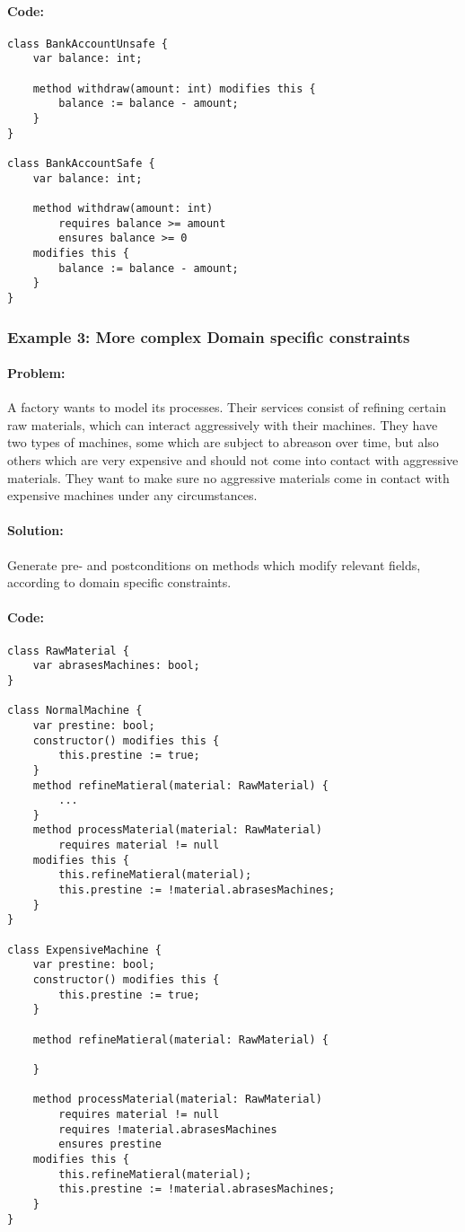 \paragraph{Code:}
\begin{lstlisting}[language=dafny]
class BankAccountUnsafe {
	var balance: int;
	
	method withdraw(amount: int) modifies this {
		balance := balance - amount;
	}
}

class BankAccountSafe {
	var balance: int;
	
	method withdraw(amount: int) 
		requires balance >= amount  
		ensures balance >= 0  
	modifies this {
		balance := balance - amount;
	}
}
\end{lstlisting}
\subsubsection{Example 3: More complex Domain specific constraints} \label{Example 3}
\paragraph{Problem:}
A factory wants to model its processes. Their services consist of refining certain raw materials, which can interact aggressively with their machines. They have two types of machines, some which are subject to abreason over time, but also others which are very expensive and should not come into contact with aggressive materials. They want to make sure no aggressive materials come in contact with expensive machines under any circumstances.
\paragraph{Solution:}
Generate pre- and postconditions on methods which modify relevant fields, according to domain specific constraints.
\paragraph{Code:}
\begin{lstlisting}[language=dafny]
class RawMaterial {
	var abrasesMachines: bool;
}

class NormalMachine {
	var prestine: bool;
	constructor() modifies this {
		this.prestine := true;
	}
	method refineMatieral(material: RawMaterial) {
		...
	}
	method processMaterial(material: RawMaterial) 
		requires material != null
	modifies this {
		this.refineMatieral(material);
		this.prestine := !material.abrasesMachines;
	}
}

class ExpensiveMachine {
	var prestine: bool;
	constructor() modifies this {
		this.prestine := true;
	}
	
	method refineMatieral(material: RawMaterial) {
	
	}
	
	method processMaterial(material: RawMaterial) 
		requires material != null
		requires !material.abrasesMachines
		ensures prestine
	modifies this {
		this.refineMatieral(material);
		this.prestine := !material.abrasesMachines;
	}
}
\end{lstlisting}
